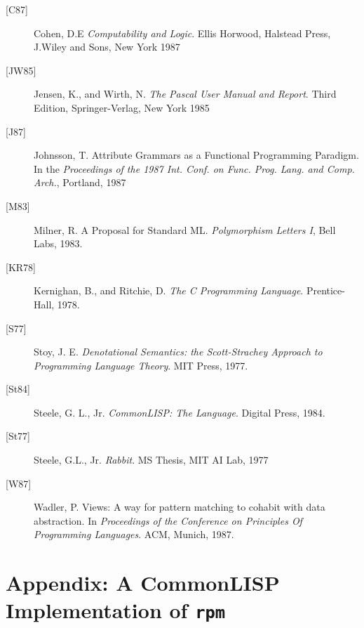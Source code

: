 \documentclass[a4paper,11pt]{article}
\newcommand{\rpm}{\texttt{rpm}}
\begin{document}
\begin{description}
\item[\mbox{[C87]}]
        Cohen, D.E \emph{Computability and Logic}. Ellis Horwood,
Halstead Press, J.Wiley and Sons, New York 1987
\item[\mbox{[JW85]}]
        Jensen, K., and Wirth, N. \emph{The Pascal User Manual and
Report}. Third Edition, Springer-Verlag, New York 1985
\item[\mbox{[J87]}]
	Johnsson, T. Attribute Grammars as a Functional Programming
Paradigm. In the \emph{Proceedings of the 1987 Int. Conf. on Func. Prog.
Lang. and Comp. Arch.}, Portland, 1987
\item[\mbox{[M83]}]
        Milner, R. A Proposal for Standard ML. \emph{Polymorphism Letters I},
Bell Labs, 1983.
\item[\mbox{[KR78]}]
        Kernighan, B., and Ritchie, D. \emph{The C Programming
Language}. Prentice-Hall, 1978.
\item[\mbox{[S77]}]
        Stoy, J. E. \emph{Denotational Semantics: the Scott-Strachey
Approach to Programming Language Theory}. MIT Press, 1977.
\item[\mbox{[St84]}]
        Steele, G. L., Jr. \emph{CommonLISP: The Language}. Digital Press, 1984.
\item[\mbox{[St77]}]
        Steele, G.L., Jr. \emph{Rabbit}. MS Thesis, MIT AI Lab, 1977
\item[\mbox{[W87]}]
        Wadler, P. Views: A way for pattern matching to cohabit with
data abstraction. In \emph{Proceedings of the Conference on Principles
Of Programming Languages}. ACM, Munich, 1987.
\end{description}

\newpage
\section*{Appendix: A CommonLISP Implementation of \rpm}
\end{document}
